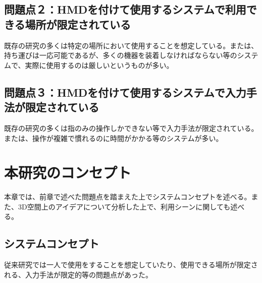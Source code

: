 \documentclass[11pt,a4j, titlepage]{jarticle} %
\begin{document}
\subsection*{問題点２：HMDを付けて使用するシステムで利用できる場所が限定されている}
既存の研究の多くは特定の場所において使用することを想定している。または、持ち運びは一応可能であるが、多くの機器を装着しなければならない等のシステムで、実際に使用するのは厳しいというものが多い。

\subsection*{問題点３：HMDを付けて使用するシステムで入力手法が限定されている}
既存の研究の多くは指のみの操作しかできない等で入力手法が限定されている。または、操作が複雑で慣れるのに時間がかかる等のシステムが多い。

\newpage
\section{本研究のコンセプト}
本章では、前章で述べた問題点を踏まえた上でシステムコンセプトを述べる。また、3D空間上のアイデアについて分析した上で、利用シーンに関しても述べる。

\subsection{システムコンセプト} \label{concept}
従来研究では一人で使用をすることを想定していたり、使用できる場所が限定される、入力手法が限定的等の問題点があった。

%
%
%
\end{document}
